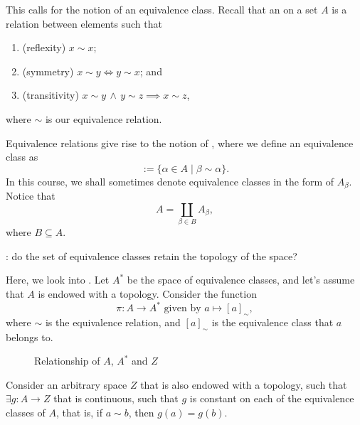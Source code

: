 \documentclass[notoc,notitlepage]{tufte-book}
\begin{document}
This calls for the notion of an equivalence class. Recall that an 
on a set $A$ is a relation between elements such that
\begin{enumerate}
  \item (reflexity) $x \sim x$;
  \item (symmetry) $x \sim y \iff y \sim x$; and
  \item (transitivity) $x \sim y \, \land \, y \sim z \implies x \sim z$,
\end{enumerate}
where $\sim$ is our equivalence relation.

Equivalence relations give rise to the notion of , where we define
an equivalence class as
\begin{equation*}
  [\beta] := \{ \alpha \in A \mid \beta \sim \alpha \}.
\end{equation*}
In this course, we shall sometimes denote equivalence classes in the form of $A_\beta$. Notice
that
\begin{equation*}
  A = \coprod\limits_{\beta \in B} A_\beta,
\end{equation*}
where $B \subseteq A$.

: do the set of equivalence classes retain the topology of
the space?

Here, we look into . Let $A^*$ be the space of equivalence classes,
and let's assume that $A$ is endowed with a topology. Consider the function
\begin{equation*}
  \pi : A \to A^* \text{ given by } a \mapsto [a]_{\sim},
\end{equation*}
where $\sim$ is the equivalence relation, and $[a]_{\sim}$ is the equivalence class that $a$
belongs to.

\begin{figure}[ht]
  \centering
  \caption{Relationship of $A$, $A^*$ and $Z$}
  \label{fig:relationship_of_a_a_and_z_}
\end{figure}

Consider an arbitrary space $Z$ that is also endowed with a topology, such that
$\exists g : A \to Z$ that is continuous, such that $g$ is constant on each of the equivalence
classes of $A$, that is, if $a \sim b$, then $g(a) = g(b)$.
\end{document}
